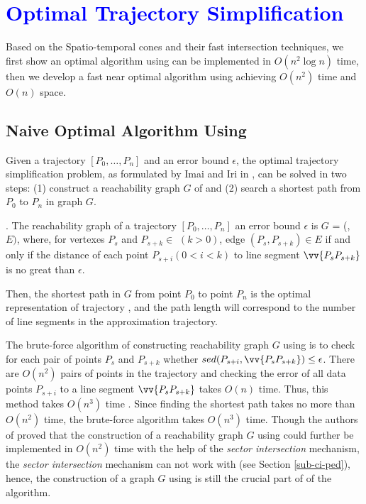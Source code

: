 \section{\textcolor{blue}{Optimal Trajectory Simplification}}
\label{sec-optimal}

Based on the Spatio-temporal cones and their fast intersection techniques, we first show an optimal algorithm using \sed can be implemented in $O(n^2\log n)$ time, then we develop a fast near optimal algorithm using \sed achieving $O(n^2)$ time and $O(n)$ space.

\subsection{Naive Optimal Algorithm Using \sed}

Given a trajectory ${[P_0, \ldots, P_n]}$ and an error bound $\epsilon$, the optimal trajectory simplification problem, as formulated by Imai and Iri in \cite{Imai:Optimal}, can be solved in two steps: (1) construct a reachability graph $G$ of  and (2) search a shortest path from $P_0$ to $P_{n}$ in graph $G$.

. The reachability graph of a trajectory ${[P_0, \ldots, P_n]}$ \wrt an error bound $\epsilon$ is $G$
= (, $E)$, where, for vertexes $P_s$ and $P_{s+k} \in$  $(k>0)$, edge $(P_s, P_{s+k}) \in E$ if and only if the distance of each point $P_{s+i} (0<i<k)$ to line segment $\vv{P_sP_{s+k}}$ is no great than $\epsilon$.

Then, the shortest path in $G$ from point $P_0$ to point $P_{n}$ is the optimal representation of trajectory , and the path length will correspond to the number of line segments in the approximation trajectory\cite{Imai:Optimal}. 


The brute-force algorithm of constructing reachability graph $G$ using \sed is to check for each pair of points $P_s$ and $P_{s+k}$ whether $sed(P_{s+i}, \vv{P_sP_{s+k}}) \le \epsilon$. 
There are $O(n^2)$ pairs of points in the trajectory and checking the error of all data points $P_{s+i}$ to a line segment $\vv{P_sP_{s+k}}$ takes $O(n)$ time. 
Thus, this method takes $O(n^3)$ time \cite{Imai:Optimal}. 
Since finding the shortest path takes no more than $O(n^2)$ time, the brute-force algorithm takes $O(n^3)$ time.
%
Though the authors of \cite{Chan:Optimal} proved that the construction of a reachability graph $G$ using \ped could further be implemented in $O(n^2)$ time with the help of the \textit{sector intersection} mechanism, the \textit{sector intersection} mechanism can not work with \sed (see Section \ref{sub-ci-ped}), hence, the construction of a graph  $G$ using \sed is still the crucial part of of the algorithm.
 
